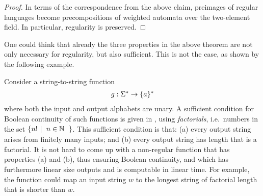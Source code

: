 \begin{proof}
        In terms of the correspondence from the above claim, preimages of regular languages become precompositions of weighted automata over the two-element field. In particular, regularity is preserved. 
\end{proof}

One could think that already the three properties in the above theorem are not only necessary for regularity, but also sufficient. This is not the case, as shown by the following example.

\begin{myexample}[Factorials]
    \label{ex:not-regular-but-continuous-over-finite-fields}
    Consider a string-to-string function 
    \begin{align*}
    g : \Sigma^* \to \{a\}^*
    \end{align*}
    where both the input and output alphabets are unary. A sufficient condition for Boolean continuity of such functions is given in  \cite[Example 2.12]{bojanczykTitoRegular23}, using \emph{factorials}, i.e.~numbers in the set $\setbuild{n!}{$n \in \Nat$}$. This sufficient condition is that: (a) every output string arises from finitely many inputs; and (b) every output string has length that is a factorial. 
    It is not hard to come up with a non-regular function that has  properties (a) and (b), thus ensuring Boolean continuity, and which has furthermore linear size outputs and is computable in linear time. For example, the function could map an input string $w$ to the longest string of factorial length that is shorter than $w$. 
\end{myexample}
